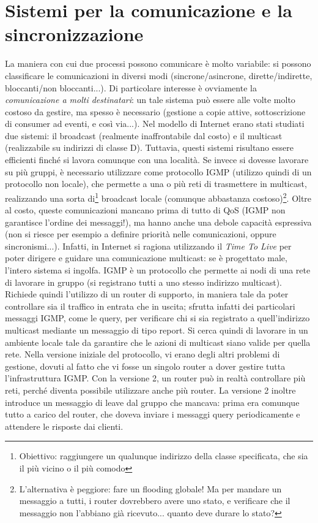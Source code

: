 \section{Sistemi per la comunicazione e la sincronizzazione}
La maniera con cui due processi possono comunicare è molto variabile: si possono classificare le comunicazioni in
diversi modi (sincrone/asincrone, dirette/indirette, bloccanti/non bloccanti...). Di particolare interesse è
ovviamente la \textit{comunicazione a molti destinatari}: un tale sistema può essere alle volte molto costoso da
gestire, ma spesso è necessario (gestione a copie attive, sottoscrizione di consumer ad eventi, e così via...).
Nel modello di Internet erano stati studiati due sistemi: il broadcast (realmente inaffrontabile dal costo) e
il multicast (realizzabile su indirizzi di classe D). Tuttavia, questi sistemi risultano essere efficienti finché si
lavora comunque con una località. Se invece si dovesse lavorare su più gruppi, è necessario utilizzare come protocollo
IGMP (utilizzo quindi di un protocollo non locale), che permette a una o più reti di trasmettere in multicast,
realizzando una sorta di\footnote{Obiettivo: raggiungere un qualunque indirizzo della classe specificata, che sia il più
vicino o il più comodo} broadcast locale (comunque abbastanza costoso)\footnote{L'alternativa è peggiore: fare un
flooding globale! Ma per mandare un messaggio a tutti, i router dovrebbero avere uno stato, e verificare che il messaggio
non l'abbiano già ricevuto... quanto deve durare lo stato?}. Oltre al costo, queste comunicazioni mancano prima di 
tutto di QoS (IGMP non garantisce l'ordine dei messaggi!), ma hanno anche una debole capacità espressiva (non si riesce
per esempio a definire priorità nelle comunicazioni, oppure sincronismi...). Infatti, in Internet si ragiona utilizzando
il \textit{Time To Live} per poter dirigere e guidare una comunicazione multicast: se è progettato male, l'intero
sistema si ingolfa. 
IGMP è un protocollo che permette ai nodi di una rete di lavorare in gruppo (si registrano tutti a uno stesso indirizzo
multicast). Richiede quindi l'utilizzo di un router di supporto, in maniera tale da poter controllare sia il traffico in
entrata che in uscita; sfrutta infatti dei particolari messaggi IGMP, come le query, per verificare chi si sia registrato
a quell'indirizzo multicast mediante un messaggio di tipo report. Si cerca quindi di lavorare in un ambiente locale tale
da garantire che le azioni di multicast siano valide per quella rete.
Nella versione iniziale del protocollo, vi erano degli altri problemi di gestione, dovuti al fatto che vi fosse un
singolo router a dover gestire tutta l'infrastruttura IGMP. Con la versione 2, un router può in realtà controllare più
reti, perché diventa possibile utilizzare anche più router. La versione 2 inoltre introduce un messaggio di leave dal
gruppo che mancava: prima era comunque tutto a carico del router, che doveva inviare i messaggi query periodicamente
e attendere le risposte dai clienti.
